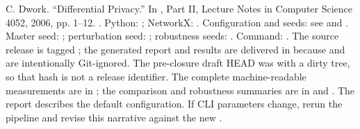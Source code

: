 C. Dwork. “Differential Privacy.” In , Part II, Lecture Notes in Computer Science 4052, 2006, pp. 1–12. .\markdownRendererOlItemEnd 
\markdownRendererOlEndTight \markdownRendererInterblockSeparator
{}
\markdownRendererSectionEnd \markdownRendererSectionBegin
{}\markdownRendererInterblockSeparator
{}\markdownRendererUlBeginTight
\markdownRendererUlItem Python: ; NetworkX: .\markdownRendererUlItemEnd 
\markdownRendererUlItem Configuration and seeds: see  and .\markdownRendererUlItemEnd 
\markdownRendererUlItem Master seed: ; perturbation seed: ; robustness seeds: .\markdownRendererUlItemEnd 
\markdownRendererUlItem Command: .\markdownRendererUlItemEnd 
\markdownRendererUlItem The source release is tagged ; the generated report and results are delivered in  because  and  are intentionally Git-ignored. The pre-closure draft HEAD was  with a dirty tree, so that hash is not a release identifier.\markdownRendererUlItemEnd 
\markdownRendererUlItem The complete machine-readable measurements are in ; the comparison and robustness summaries are in  and .\markdownRendererUlItemEnd 
\markdownRendererUlItem The report describes the default configuration. If CLI parameters change, rerun the pipeline and revise this narrative against the new .\markdownRendererUlItemEnd 
\markdownRendererUlEndTight \markdownRendererInterblockSeparator
{}
\markdownRendererSectionEnd \markdownRendererSectionBegin
{}\markdownRendererInterblockSeparator
